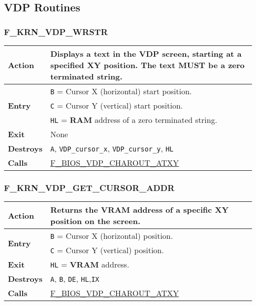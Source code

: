 \subsection{VDP Routines}

    \subsubsection{F\_KRN\_VDP\_WRSTR}
    \label{func:fkrnvdpwrstr}
    \begin{tabular}{l p{15cm}}
        \hline\textbf{Action}
        & Displays a text in the VDP screen, starting at a specified XY
        position. The text MUST be a zero terminated string. \\
        \hline\multirow[t]{3}{4em}{\textbf{Entry}}
        & \texttt{B} = Cursor X (horizontal) start position.\\
        & \texttt{C} = Cursor Y (vertical) start position.\\
        & \texttt{HL} = \textbf{RAM} address of a zero terminated string.\\
        \hline\textbf{Exit} & None\\
        \hline\textbf{Destroys} & \texttt{A}, \texttt{VDP\_cursor\_x},
            \texttt{VDP\_cursor\_y}, \texttt{HL} \\
        \hline\textbf{Calls} & 
        \hyperref[func:fbiosvdpcharoutatxy]{F\_BIOS\_VDP\_CHAROUT\_ATXY}\\
        \hline
    \end{tabular}

    \subsubsection{F\_KRN\_VDP\_GET\_CURSOR\_ADDR}
    \label{func:fkrnvdpgetcursoraddr}
    \begin{tabular}{l p{15cm}}
        \hline\textbf{Action}
        & Returns the \textbf{VRAM} address of a specific XY position on the
        screen. \\
        \hline\multirow[t]{2}{4em}{\textbf{Entry}}
        & \texttt{B} = Cursor X (horizontal) position.\\
        & \texttt{C} = Cursor Y (vertical) position.\\
        \hline\textbf{Exit} & \texttt{HL} = \textbf{VRAM} address.\\
        \hline\textbf{Destroys} & \texttt{A}, \texttt{B}, \texttt{DE},
            \texttt{HL},\texttt{IX} \\
        \hline\textbf{Calls} & 
        \hyperref[func:fbiosvdpcharoutatxy]{F\_BIOS\_VDP\_CHAROUT\_ATXY}\\
        \hline
    \end{tabular}

